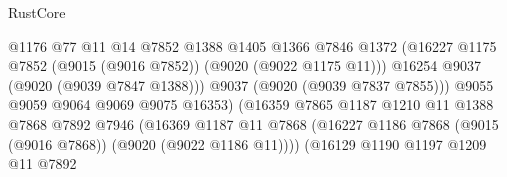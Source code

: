 \begin{lexlean}{RustCore}
\begin{coremodule}
                                              @1176
                                              @77
                                              @11
                                              @14
                                              @7852
                                              @1388
                                              @1405
                                              @1366
                                              @7846
                                              @1372
                                              (@16227
                                                @1175
                                                @7852
                                                (@9015 (@9016 @7852))
                                                (@9020 (@9022 @1175 @11)))
                                              @16254
                                              @9037
                                              (@9020 (@9039 @7847 @1388)))
                                            @9037
                                            (@9020 (@9039 @7837 @7855)))
                                          @9055
                                          @9059
                                          @9064
                                          @9069
                                          @9075
                                          @16353)
                                        (@16359
                                          @7865
                                          @1187
                                          @1210
                                          @11
                                          @1388
                                          @7868
                                          @7892
                                          @7946
                                          (@16369
                                            @1187
                                            @11
                                            @7868
                                            (@16227
                                              @1186
                                              @7868
                                              (@9015 (@9016 @7868))
                                              (@9020 (@9022 @1186 @11))))
                                          (@16129
                                            @1190
                                            @1197
                                            @1209
                                            @11
                                            @7892

\end{coremodule}
\end{lexlean}
